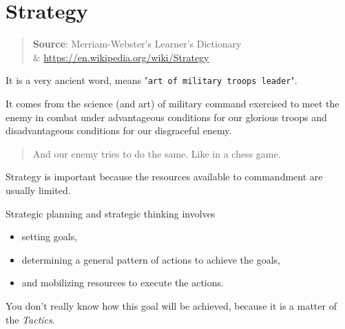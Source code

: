 \section{Strategy}
\label{sec:Strategy}

\begin{quote}
\textbf{Source}: Merriam-Webster's Learner's Dictionary \\ \& \url{https://en.wikipedia.org/wiki/Strategy}
\end{quote} 

 It is a very ancient word, means "\texttt{art of military troops leader}". 

It comes from the science (and art) of military command exercised to meet the enemy in combat under advantageous conditions for our glorious troops and disadvantageous conditions for our disgraceful enemy. 

\begin{quote}
And our enemy tries to do the same. Like in a chess game.
\end{quote} 

Strategy is important because the resources available to commandment are usually limited.

Strategic planning and strategic thinking involves 
\begin{itemize}
\item 
setting goals, 
\item determining a general pattern of actions to achieve the goals, 
\item and mobilizing resources to execute the actions.                                                \end{itemize}

You don't really know how this goal will be achieved, because it is a matter of the \emph{Tactics}.
